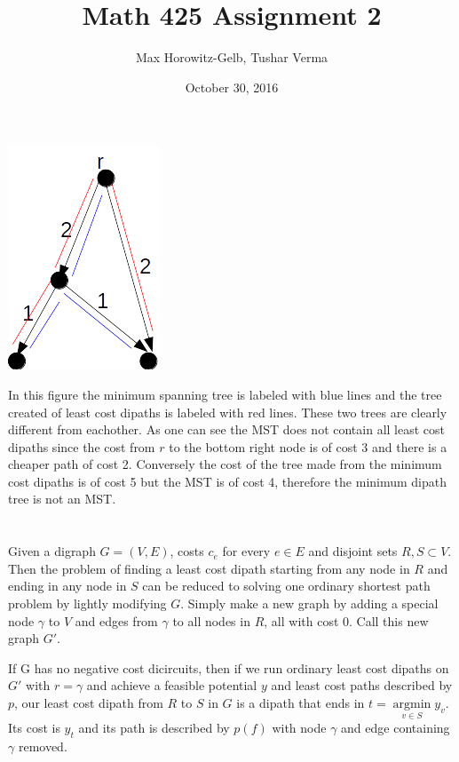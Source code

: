 \documentclass{article}
\title{Math 425 Assignment 2}
\author{Max Horowitz-Gelb, Tushar Verma}
\date{October 30, 2016}
\DeclareMathOperator*{\argmin}{argmin}
\begin{document}
\maketitle
\section{}
\includegraphics[scale=0.5]{tree}

In this figure the minimum spanning tree is labeled with blue lines and the tree created of least cost dipaths is labeled with red lines. These two trees are clearly different from eachother. As one can see the MST does not contain all least cost dipaths since the cost from $r$ to the bottom right node is of cost 3 and there is a cheaper path of cost 2. Conversely the cost of the tree made from the minimum cost dipaths is of cost 5 but the MST is of cost 4, therefore the minimum dipath tree is not an MST.
\section{}
Given a digraph $G = (V,E)$, costs $c_e$ for every $e \in E$ and disjoint sets $R,S \subset V$. Then the problem of finding a least cost dipath starting from any node in $R$ and ending in any node in $S$ can be reduced to solving one ordinary shortest path problem by lightly modifying $G$. Simply make a new graph by adding a special node $\gamma$ to $V$ and edges from $\gamma$ to all nodes in $R$, all with cost $0$. Call this new graph  $G'$.

If G has no negative cost dicircuits, then if we run ordinary least cost dipaths on $G'$ with $r = \gamma$ and achieve a feasible potential $y$ and least cost paths
described by 
$p$, our least cost dipath from $R$ to $S$ in $G$ is a dipath that ends in $t = \argmin\limits_{v \in S} y_v$. Its cost is $y_t$ and its path is described by $p(f)$ with node $\gamma$ and edge containing $\gamma$ removed.
\end{document}

